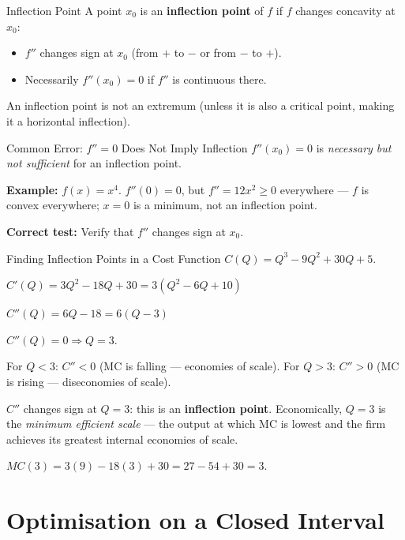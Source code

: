 \documentclass[12pt, a4paper]{article}
\theoremstyle{definition}
\begin{document}
\begin{defbox}{Inflection Point}
A point $x_0$ is an \textbf{inflection point} of $f$ if $f$ changes
concavity at $x_0$:
\begin{itemize}
  \item $f''$ changes sign at $x_0$ (from $+$ to $-$ or from $-$ to $+$).
  \item Necessarily $f''(x_0) = 0$ if $f''$ is continuous there.
\end{itemize}
An inflection point is not an extremum (unless it is also a critical point,
making it a horizontal inflection).
\end{defbox}
\newpage
\begin{warnbox}{Common Error: $f''=0$ Does Not Imply Inflection}
$f''(x_0)=0$ is \emph{necessary but not sufficient} for an inflection point.

\textbf{Example:} $f(x) = x^4$.  $f''(0) = 0$, but $f'' = 12x^2 \geq 0$
everywhere --- $f$ is convex everywhere; $x=0$ is a minimum, not an
inflection point.

\textbf{Correct test:} Verify that $f''$ changes sign at $x_0$.
\end{warnbox}

\begin{exbox}{Finding Inflection Points in a Cost Function}
$C(Q) = Q^3 - 9Q^2 + 30Q + 5$.

$C'(Q) = 3Q^2 - 18Q + 30 = 3(Q^2-6Q+10)$

$C''(Q) = 6Q - 18 = 6(Q-3)$

$C''(Q) = 0 \Rightarrow Q = 3$.

For $Q < 3$: $C''<0$ (MC is falling --- economies of scale).
For $Q > 3$: $C''>0$ (MC is rising --- diseconomies of scale).

$C''$ changes sign at $Q=3$: this is an \textbf{inflection point}.
Economically, $Q=3$ is the \emph{minimum efficient scale} --- the output
at which MC is lowest and the firm achieves its greatest internal economies
of scale.

$MC(3) = 3(9)-18(3)+30 = 27-54+30 = 3$.
\end{exbox}

\section{Optimisation on a Closed Interval}
\end{document}
